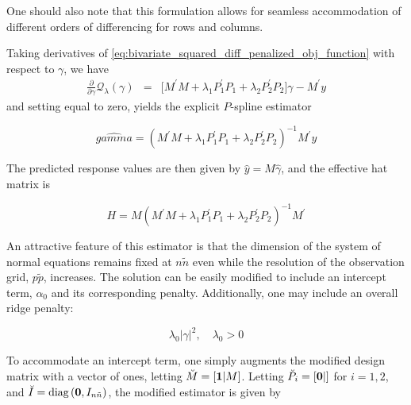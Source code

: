\documentclass[12pt]{article}
\newcommand*\needsparaphrased{\color{red}}
\newcommand{\bfone}{\mbox{\boldmath $1$}}
\newcommand{\bfo}{\mbox{\boldmath $0$}}
\begin{document}
One should also note that this formulation allows for seamless accommodation of different orders of differencing for rows and columns. 

Taking derivatives of \ref{eq:bivariate_squared_diff_penalized_obj_function} with respect to $\gamma$, we have
\begin{eqnarray*}
\frac{\partial}{\partial \gamma}\mathcal{Q}_{\lambda}\left(\gamma\right)&=& \bigg[M^\prime M + \lambda_1P_1^\prime P_1 + \lambda_2P_2^\prime P_2 \bigg]\gamma - M^\prime y
\end{eqnarray*}
\noindent
and setting equal to zero, yields the explicit $P$-spline estimator

\begin{equation} \label{eq:pspline_estimator}
\hat{gamma} = \left( M^\prime M + \lambda_1 P_1^\prime P_1 + \lambda_2 P_2^\prime P_2\right)^{-1}M^\prime y
\end{equation}

{\needsparaphrased The predicted response values are then given by $\hat{y} = M\hat{\gamma}$, and the effective hat matrix is}

\begin{equation} \label{eq:bivariate_pspline_hat_matrix}
H = M\left( M^\prime M + \lambda_1 P_1^\prime P_1 + \lambda_2 P_2^\prime P_2\right)^{-1} M^\prime
\end{equation}

An attractive feature of this estimator is that the dimension of the system of normal equations remains fixed at $n\tilde{n}$ even while the resolution of the observation grid, $p\tilde{p}$, increases. The solution can be easily modified to include an intercept term, $\alpha_0$ and its corresponding penalty. Additionally, one may include an overall ridge penalty:

\[
\lambda_0 \vert \gamma \vert^2, \quad \lambda_0 > 0
\] 

To accommodate an intercept term, one simply augments the modified design matrix with a vector of ones, letting $\breve{M} = \left[ \bfone \vert M \right]$. Letting $\breve{P}_i = \left[ \bfo \vert\right]$ for $i=1,2$, and $\breve{I} = \textup{diag}\left(\bfo, I_{n\tilde{n}}\right)$, the modified estimator is given by 
\end{document}
